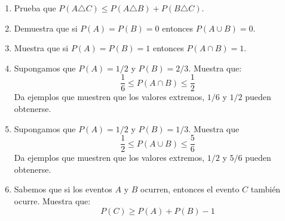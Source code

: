\documentclass[12pt]{extreport}
\begin{document}
\begin{enumerate}
    \item Prueba que $P(A\triangle C)\leq P(A\triangle B) + P(B\triangle C)$.
    \item Demuestra que si $P(A) = P(B) = 0 $ entonces $P(A\cup B) = 0$.
    \item Muestra que si $P(A) = P(B) = 1$ entonces $P(A\cap B) = 1$.
    \item Supongamos que $P(A)= 1/2$ y $P(B)= 2/3$. Muestra que:
    $$
    \frac{1}{6} \leq P(A\cap B) \leq \frac{1}{2}
    $$
    Da ejemplos que muestren que los valores extremos, $1/6$ y $1/2$ pueden obtenerse.
    \item Supongamos que $P(A) = 1/2$ y $P(B) = 1/3$. Muestra que
    $$
    \frac{1}{2}\leq P(A\cup B)\leq \frac{5}{6}
    $$
    Da ejemplos que muestren que los valores extremos, $1/2$ y $5/6$ pueden obtenerse.

    \item Sabemos que si los eventos $A$ y $B$ ocurren, entonces el evento $C$ también ocurre. Muestra que:
    $$
    P(C) \geq P(A) + P(B) - 1
    $$ 
\end{enumerate}
\end{document}
